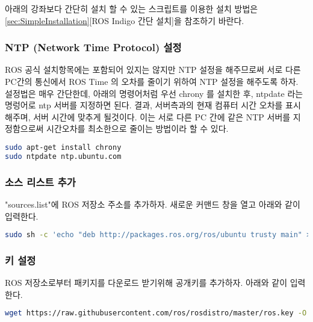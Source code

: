 \begin{exercise}[간단 설치]
아래의 강좌보다 간단히 설치 할 수 있는 스크립트를 이용한 설치 방법은 \ref{sec:SimpleInstallation}[ROS Indigo 간단 설치]을 참조하기 바란다.
\end{exercise}

\subsubsection{NTP (Network Time Protocol) 설정}
ROS 공식 설치항목에는 포함되어 있지는 않지만 NTP 설정을 해주므로써 서로 다른 PC간의 통신에서 ROS Time 의 오차를 줄이기 위하여 NTP 설정을 해주도록 하자. 설정법은 매우 간단한데, 아래의 명령어처럼 우선 chrony 를 설치한 후, ntpdate 라는 명렁어로 ntp 서버를 지정하면 된다. 결과, 서버측과의 현재 컴퓨터 시간 오차를 표시해주며, 서버 시간에 맞추게 될것이다. 이는 서로 다른 PC 간에 같은 NTP 서버를 지정함으로써 시간오차를 최소한으로 줄이는 방법이라 할 수 있다.

\begin{lstlisting}[language=bash]
sudo apt-get install chrony
sudo ntpdate ntp.ubuntu.com
\end{lstlisting}

\subsubsection{소스 리스트 추가}
"sources.list"에 ROS 저장소 주소를 추가하자. 새로운 커맨드 창을 열고 아래와 같이 입력한다. 

\begin{lstlisting}[language=bash]
sudo sh -c 'echo "deb http://packages.ros.org/ros/ubuntu trusty main" > /etc/apt/sources.list.d/ros-latest.list'
\end{lstlisting}

\subsubsection{키 설정}
ROS 저장소로부터 패키지를 다운로드 받기위해 공개키를 추가하자. 아래와 같이 입력한다.

\begin{lstlisting}[language=bash]
wget https://raw.githubusercontent.com/ros/rosdistro/master/ros.key -O - | sudo apt-key add -
\end{lstlisting}

